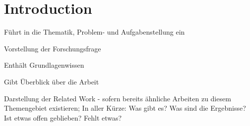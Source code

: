 \chapter{Introduction}
\label{ch:introduction}

Führt in die Thematik, Problem- und Aufgabenstellung ein

Vorstellung der Forschungsfrage

Enthält Grundlagenwissen

Gibt Überblick über die Arbeit

Darstellung der Related Work - sofern bereits ähnliche Arbeiten zu diesem Themengebiet existieren; In aller Kürze: Was gibt es? Was sind die Ergebnisse? Ist etwas offen geblieben? Fehlt etwas?
